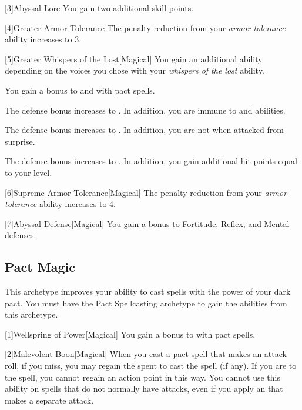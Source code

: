         [3]{Abyssal Lore} You gain two additional skill points.

        [4]{Greater Armor Tolerance} The penalty reduction from your \textit{armor tolerance} ability increases to 3.

        [5]{Greater Whispers of the Lost}[Magical] You gain an additional ability depending on the voices you chose with your \textit{whispers of the lost} ability.
        {
             You gain a  bonus to  and  with pact spells.

             The defense bonus increases to .
            In addition, you are immune to  and  abilities.

             The defense bonus increases to .
            In addition, you are not  when attacked from surprise.

             The defense bonus increases to .
            In addition, you gain additional hit points equal to your level.
        }

        [6]{Supreme Armor Tolerance}[Magical] The penalty reduction from your \textit{armor tolerance} ability increases to 4.

        [7]{Abyssal Defense}[Magical] You gain a  bonus to Fortitude, Reflex, and Mental defenses.

    \subsection{Pact Magic}
        This archetype improves your ability to cast spells with the power of your dark pact.
        You must have the Pact Spellcasting archetype to gain the abilities from this archetype.

        [1]{Wellspring of Power}[Magical]
        You gain a  bonus to  with pact spells.

        [2]{Malevolent Boon}[Magical]
        When you cast a pact spell that makes an attack roll, if you miss, you may regain the  spent to cast the spell (if any).
        If you are  to the spell, you cannot regain an action point in this way.
        You cannot use this ability on spells that do not normally have attacks, even if you apply an  that makes a separate attack.

